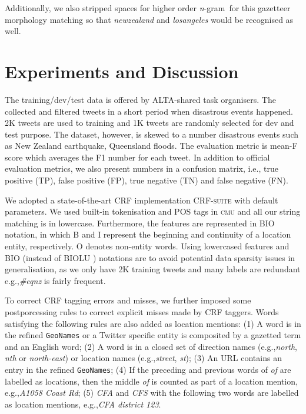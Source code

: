 \documentclass[11pt]{article}
\newcommand{\eg}{e.g.,\xspace}
\newcommand{\ie}{i.e.,\xspace}
\newcommand{\geoname}{\texttt{GeoNames}\xspace}
\newcommand{\myex}[1]{\textit{#1}}
\newcommand{\method}[1]{\textsf{#1}\xspace}
\newcommand{\ngram}{\textit{n}-gram\ }
\newcommand{\cmu}{\textsc{cmu}\xspace}
\newcommand{\crfsuite}{\textsc{CRF-suite}\xspace}
\begin{document}
Additionally, we also stripped spaces for higher order \ngram for this gazetteer morphology matching so that \myex{newzealand} and \myex{losangeles} would be recognised as well.

\section{Experiments and Discussion}
\label{sec:experiment}

The training/dev/test data is offered by ALTA-shared task organisers.
The collected and filtered tweets in a short period when disastrous events happened.
2K tweets are used to training and 1K tweets are randomly selected for dev and test purpose.
The dataset, however, is skewed to a number disastrous events such as New Zealand earthquake, Queensland floods.
The evaluation metric is mean-F score which averages the F1 number for each tweet.
In addition to official evaluation metrics, we also present numbers in a confusion matrix, \ie true positive (TP), false positive (FP), true negative (TN) and false negative (FN).

We adopted a state-of-the-art CRF implementation \crfsuite \cite{crfsuite} with default parameters.
We used built-in tokenisation and POS tags in \cmu and all our string matching is in lowercase.
Furthermore, the features are represented in \method{BIO} notation, in which \method{B} and \method{I} represent the beginning and continuity of a location entity, respectively.
\method{O} denotes non-entity words.
Using lowercased features and \method{BIO} (instead of \method{BIOLU} \cite{conll09rati}) notations are to avoid potential data sparsity issues in generalisation, as we only have 2K training tweets and many labels are redundant \eg \myex{\#eqnz} is fairly frequent.

To correct CRF tagging errors and misses, we further imposed some postporcessing rules to correct explicit misses made by CRF taggers.
Words satisfying the following rules are also added as location mentions:
(1) A word is in the refined \geoname or a Twitter specific entity is composited by a gazetted term and an English word;
(2) A word is in a closed set of direction names (\eg \myex{north}, \myex{nth} or \myex{north-east}) or location names (\eg \myex{street}, \myex{st});
(3) An URL contains an entry in the refined \geoname;
(4) If the preceding and previous words of \myex{of} are labelled as locations, then the middle \myex{of} is counted as part of a location mention, \eg \myex{A1058 Coast Rd};
(5) \myex{CFA} and \myex{CFS} with the following two words are labelled as location mentions, \eg \myex{CFA district 123}.
\end{document}
